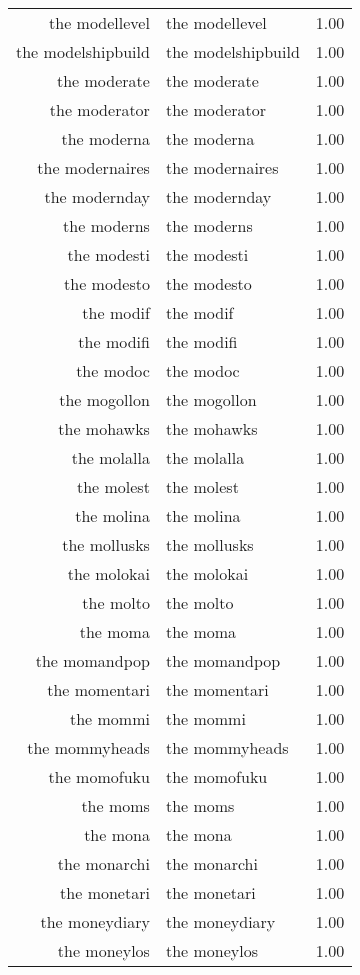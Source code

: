 \begin{table}[ht]
\begin{tabular}{rlr}
  the modellevel & the modellevel & 1.00 \\ 
  the modelshipbuild & the modelshipbuild & 1.00 \\ 
  the moderate & the moderate & 1.00 \\ 
  the moderator & the moderator & 1.00 \\ 
  the moderna & the moderna & 1.00 \\ 
  the modernaires & the modernaires & 1.00 \\ 
  the modernday & the modernday & 1.00 \\ 
  the moderns & the moderns & 1.00 \\ 
  the modesti & the modesti & 1.00 \\ 
  the modesto & the modesto & 1.00 \\ 
  the modif & the modif & 1.00 \\ 
  the modifi & the modifi & 1.00 \\ 
  the modoc & the modoc & 1.00 \\ 
  the mogollon & the mogollon & 1.00 \\ 
  the mohawks & the mohawks & 1.00 \\ 
  the molalla & the molalla & 1.00 \\ 
  the molest & the molest & 1.00 \\ 
  the molina & the molina & 1.00 \\ 
  the mollusks & the mollusks & 1.00 \\ 
  the molokai & the molokai & 1.00 \\ 
  the molto & the molto & 1.00 \\ 
  the moma & the moma & 1.00 \\ 
  the momandpop & the momandpop & 1.00 \\ 
  the momentari & the momentari & 1.00 \\ 
  the mommi & the mommi & 1.00 \\ 
  the mommyheads & the mommyheads & 1.00 \\ 
  the momofuku & the momofuku & 1.00 \\ 
  the moms & the moms & 1.00 \\ 
  the mona & the mona & 1.00 \\ 
  the monarchi & the monarchi & 1.00 \\ 
  the monetari & the monetari & 1.00 \\ 
  the moneydiary & the moneydiary & 1.00 \\ 
  the moneylos & the moneylos & 1.00 \\ 

\end{tabular}
\end{table}
